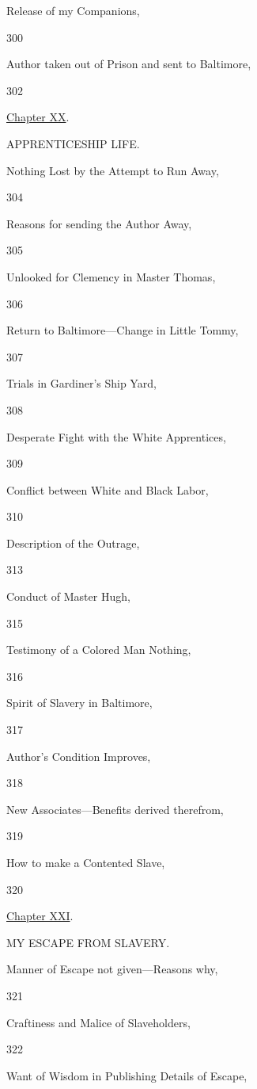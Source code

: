 Release of my Companions,

300

Author taken out of Prison and sent to Baltimore,

302

\href{/wiki/My_Bondage_and_My_Freedom_(1855)/Chapter_XX}{Chapter XX}.

APPRENTICESHIP LIFE.

Nothing Lost by the Attempt to Run Away,

304

Reasons for sending the Author Away,

305

Unlooked for Clemency in Master Thomas,

306

Return to Baltimore---Change in Little Tommy,

307

Trials in Gardiner's Ship Yard,

308

Desperate Fight with the White Apprentices,

309

Conflict between White and Black Labor,

310

Description of the Outrage,

313

Conduct of Master Hugh,

315

Testimony of a Colored Man Nothing,

316

Spirit of Slavery in Baltimore,

317

Author's Condition Improves,

318

New Associates---Benefits derived therefrom,

319

How to make a Contented Slave,

320

\href{/wiki/My_Bondage_and_My_Freedom_(1855)/Chapter_XXI}{Chapter XXI}.

MY ESCAPE FROM SLAVERY.

Manner of Escape not given---Reasons why,

321

Craftiness and Malice of Slaveholders,

322

Want of Wisdom in Publishing Details of Escape,

